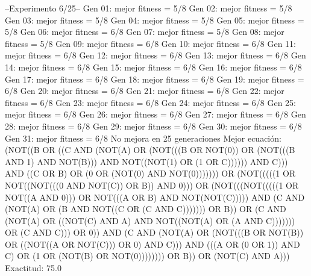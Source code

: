 --Experimento 
 6/25--
Gen 01: mejor fitness = 5/8
Gen 02: mejor fitness = 5/8
Gen 03: mejor fitness = 5/8
Gen 04: mejor fitness = 5/8
Gen 05: mejor fitness = 5/8
Gen 06: mejor fitness = 6/8
Gen 07: mejor fitness = 5/8
Gen 08: mejor fitness = 5/8
Gen 09: mejor fitness = 6/8
Gen 10: mejor fitness = 6/8
Gen 11: mejor fitness = 6/8
Gen 12: mejor fitness = 6/8
Gen 13: mejor fitness = 6/8
Gen 14: mejor fitness = 6/8
Gen 15: mejor fitness = 6/8
Gen 16: mejor fitness = 6/8
Gen 17: mejor fitness = 6/8
Gen 18: mejor fitness = 6/8
Gen 19: mejor fitness = 6/8
Gen 20: mejor fitness = 6/8
Gen 21: mejor fitness = 6/8
Gen 22: mejor fitness = 6/8
Gen 23: mejor fitness = 6/8
Gen 24: mejor fitness = 6/8
Gen 25: mejor fitness = 6/8
Gen 26: mejor fitness = 6/8
Gen 27: mejor fitness = 6/8
Gen 28: mejor fitness = 6/8
Gen 29: mejor fitness = 6/8
Gen 30: mejor fitness = 6/8
Gen 31: mejor fitness = 6/8
No mejora en 25 generaciones
Mejor ecuación: (NOT((B OR ((C AND (NOT(A) OR (NOT(((B OR NOT(0)) OR (NOT(((B AND 1) AND NOT(B))) AND NOT((NOT(1) OR (1 OR C)))))) AND C))) AND ((C OR B) OR (0 OR (NOT(0) AND NOT(0))))))) OR (NOT(((((1 OR NOT((NOT(((0 AND NOT(C)) OR B)) AND 0))) OR (NOT(((NOT(((((1 OR NOT((A AND 0))) OR NOT(((A OR B) AND NOT(NOT(C))))) AND (C AND (NOT(A) OR (B AND NOT((C OR (C AND C))))))) OR B)) OR (C AND (NOT(A) OR ((NOT(C) AND A) AND NOT((NOT(A) OR (A AND C))))))) OR (C AND C))) OR 0)) AND (C AND (NOT(A) OR (NOT(((B OR NOT(B)) OR ((NOT((A OR NOT(C))) OR 0) AND C))) AND (((A OR (0 OR 1)) AND C) OR (1 OR (NOT(B) OR NOT(0)))))))) OR B)) OR (NOT(C) AND A)))
 Exactitud: 75.0%

